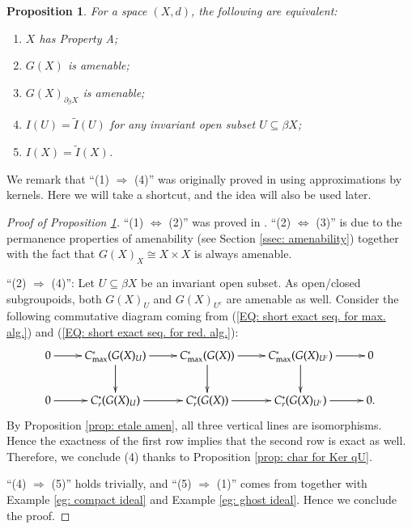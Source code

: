 \documentclass[12pt, a4paper]{amsart}
\numberwithin{equation}{section}
\newtheorem{prop}[thm]{Proposition}
\theoremstyle{definition}
\theoremstyle{remark}
\begin{document}
\begin{prop}\label{prop: property A case}
For a space $(X,d)$, the following are equivalent:
\begin{enumerate}
 \item $X$ has Property A;
 \item $G(X)$ is amenable;
 \item $G(X)_{\partial_\beta X}$ is amenable;
 \item $I(U)=\tilde{I}(U)$ for any invariant open subset $U \subseteq \beta X$;
 \item $I(X) = \tilde{I}(X)$.
\end{enumerate}
\end{prop}

We remark that ``(1) $\Rightarrow$ (4)'' was originally proved in \cite{CW05} using approximations by kernels. Here we will take a shortcut, and the idea will also be used later.

\begin{proof}[Proof of Proposition \ref{prop: property A case}]
``(1) $\Leftrightarrow$ (2)'' was proved in \cite[Theorem 5.3]{STY02}. ``(2) $\Leftrightarrow$ (3)'' is due to the permanence properties of amenability (see Section \ref{ssec: amenability}) together with the fact that $G(X)_X \cong X \times X$ is always amenable.


``(2) $\Rightarrow$ (4)'': Let $U \subseteq \beta X$ be an invariant open subset. As open/closed subgroupoids, both $G(X)_U$ and $G(X)_{U^c}$ are amenable as well. Consider the following commutative diagram coming from (\ref{EQ: short exact seq. for max. alg.}) and (\ref{EQ: short exact seq. for red. alg.}):
\[ 
\xymatrix{
		0 \ar[r] & C^*_{{\rm max}}(G(X)_U) \ar[r] \ar[d] & C^*_{{\rm max}}(G(X)) \ar[r] \ar[d] & C^*_{{\rm max}}(G(X)_{U^c}) \ar[r] \ar[d] & 0\\
		0 \ar[r] & C^*_{r}(G(X)_U) \ar[r] & C^*_{r}(G(X)) \ar[r] & C^*_{r}(G(X)_{U^c}) \ar[r] & 0.
	}
\]
By Proposition \ref{prop: etale amen}, all three vertical lines are isomorphisms. Hence the exactness of the first row implies that the second row is exact as well. Therefore, we conclude (4) thanks to Proposition \ref{prop: char for Ker qU}.

``(4) $\Rightarrow$ (5)'' holds trivially, and ``(5) $\Rightarrow$ (1)'' comes from \cite[Theorem 1.3]{RW14} together with Example \ref{eg: compact ideal} and Example \ref{eg: ghost ideal}. Hence we conclude the proof.
\end{proof}
\end{document}
